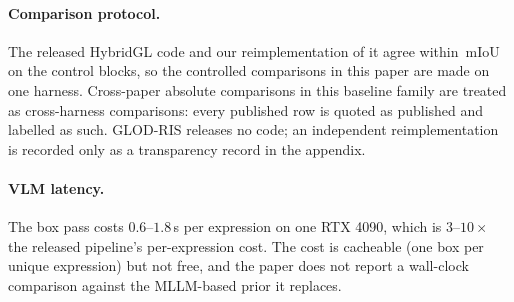 \paragraph{Comparison protocol.}
The released HybridGL code and our reimplementation of it agree within
\reproAgree\,mIoU on the control blocks, so the controlled comparisons in this
paper are made on one harness. Cross-paper absolute comparisons in this
baseline family are treated as cross-harness comparisons: every published row
is quoted as published and labelled as such. GLOD-RIS releases no code; an
independent reimplementation is recorded only as a transparency record in
the appendix.

\paragraph{VLM latency.}
The box pass costs $0.6$--$1.8$\,s per expression on one RTX 4090, which is
$3$--$10\times$ the released pipeline's per-expression cost. The cost is
cacheable (one box per unique expression) but not free, and the paper does
not report a wall-clock comparison against the MLLM-based prior it replaces.
